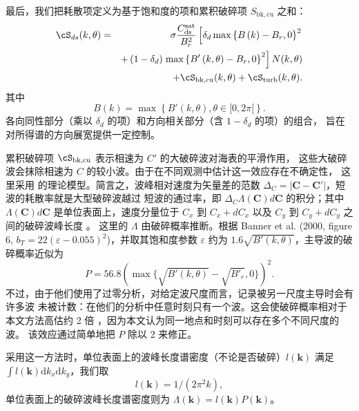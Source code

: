 最后，我们把耗散项定义为基于饱和度的项和累积破碎项
$S_{\mathrm{bk,cu}}$ 之和：
\begin{eqnarray}
\cS_{ds}(k,\theta)& =&  \sigma
 \frac{C_{\mathrm{ds}}^{\mathrm{sat}}}{B^2_r} \left[ \delta_d
\max\left\{  B\left(k\right) -
B_r,0\right\}^2 \right.
\nonumber \\
  & & +  \left(1-\delta_d \right) \left. \max\left\{B'\left(k,\theta \right)- B_r
 ,0\right\}^2\right]N(k,\theta)  \nonumber \\
 & & + \cS_{\mathrm{bk,cu}}(k,\theta) + \cS_{\mathrm{turb}}(k,\theta) \label{Sds_all}.
\end{eqnarray}
其中
\begin{equation}
B\left(k \right)=\max\left\{B'(k,\theta), \theta \in [0,2
\pi[\right\} \label{defBof}.
\end{equation}
各向同性部分（乘以 $\delta_d$ 的项）和方向相关部分（含 $1-\delta_d$ 的项）的组合，
旨在对所得谱的方向展宽提供一定控制。

累积破碎项 $\cS_{\mathrm{bk,cu}}$ 表示相速为 $C'$ 的大破碎波对海表的平滑作用，
这些大破碎波会抹除相速为 $C$ 的较小波。由于在不同观测中估计这一效应存在不确定性，
这里采用 \cite{art:Aea09} 的理论模型。简言之，波峰相对速度为矢量差的范数
$\Delta_C =\left|\mathbf{C}-\mathbf{C}'\right|$，短波的耗散率就是大型破碎波越过
短波的通过率，即 $\Delta_C \Lambda(\mathbf{C}) d\mathbf{C}$ 的积分；其中
$\Lambda (\mathbf{C}) d\mathbf{C}$ 是单位表面上，速度分量位于 $C_x$ 到
$C_x+dC_x$ 以及 $C_y$ 到 $C_y+dC_y$ 之间的破碎波峰长度 \citep{art:Phi85}。
这里的 $\Lambda$ 由破碎概率推断。根据 Banner et al. (2000, figure 6,
$b_T=22\left(\varepsilon-0.055\right)^2$)\nocite{art:BBY00}，并取其饱和度参数
$\varepsilon$ 约为 $1.6\sqrt{B'(k,\theta)}$，主导波的破碎概率近似为
\begin{equation}
P=56.8\left(\max\{\sqrt{B'(k,\theta)}-\sqrt{B'_r},0\}\right)^2.\label{PBanner}
\end{equation}
不过，由于他们使用了过零分析，对给定波尺度而言，记录被另一尺度主导时会有许多波
未被计数：在他们的分析中任意时刻只有一个波。这会使破碎概率相对于本文方法高估约
2 倍 \citep{art:FAB10}，因为本文认为同一地点和时刻可以存在多个不同尺度的波。
该效应通过简单地把 $P$ 除以 2 来修正。

采用这一方法时，单位表面上的波峰长度谱密度（不论是否破碎）$l(\mathbf{k})$ 满足
$\int l(\mathbf{k}) \mathrm{d}k_x \mathrm{d}k_y$，我们取
\begin{equation}
l(\mathbf{k})= 1/(2\pi^2 k),
\end{equation}
单位表面上的破碎波峰长度谱密度则为
$\Lambda(\mathbf{k})=l(\mathbf{k})P(\mathbf{k})$。

